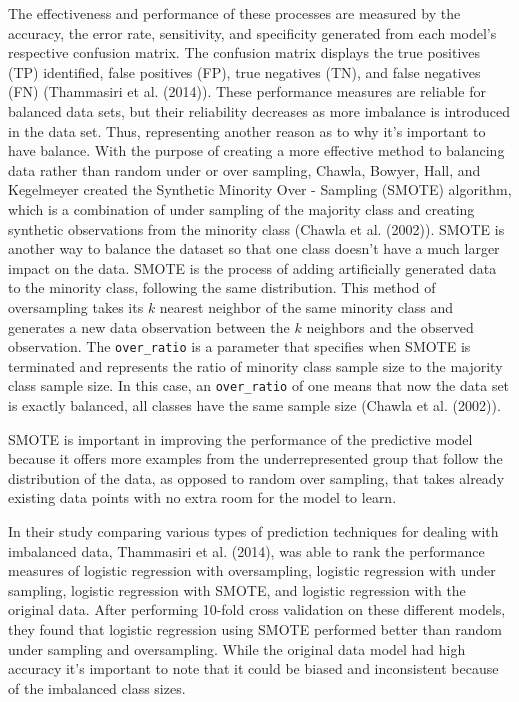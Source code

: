 \documentclass[
  letterpaper,
  DIV=11,
  numbers=noendperiod]{scrartcl}
\begin{document}
The effectiveness and performance of these processes are measured by the
accuracy, the error rate, sensitivity, and specificity generated from
each model's respective confusion matrix. The confusion matrix displays
the true positives (TP) identified, false positives (FP), true negatives
(TN), and false negatives (FN) (Thammasiri et al. (2014)). These
performance measures are reliable for balanced data sets, but their
reliability decreases as more imbalance is introduced in the data set.
Thus, representing another reason as to why it's important to have
balance. With the purpose of creating a more effective method to
balancing data rather than random under or over sampling, Chawla,
Bowyer, Hall, and Kegelmeyer created the Synthetic Minority Over -
Sampling (SMOTE) algorithm, which is a combination of under sampling of
the majority class and creating synthetic observations from the minority
class (Chawla et al. (2002)). SMOTE is another way to balance the
dataset so that one class doesn't have a much larger impact on the data.
SMOTE is the process of adding artificially generated data to the
minority class, following the same distribution. This method of
oversampling takes its \(k\) nearest neighbor of the same minority class
and generates a new data observation between the \(k\) neighbors and the
observed observation. The \texttt{over\_ratio} is a parameter that
specifies when SMOTE is terminated and represents the ratio of minority
class sample size to the majority class sample size. In this case, an
\texttt{over\_ratio} of one means that now the data set is exactly
balanced, all classes have the same sample size (Chawla et al. (2002)).

SMOTE is important in improving the performance of the predictive model
because it offers more examples from the underrepresented group that
follow the distribution of the data, as opposed to random over sampling,
that takes already existing data points with no extra room for the model
to learn.

In their study comparing various types of prediction techniques for
dealing with imbalanced data, Thammasiri et al. (2014), was able to rank
the performance measures of logistic regression with oversampling,
logistic regression with under sampling, logistic regression with SMOTE,
and logistic regression with the original data. After performing 10-fold
cross validation on these different models, they found that logistic
regression using SMOTE performed better than random under sampling and
oversampling. While the original data model had high accuracy it's
important to note that it could be biased and inconsistent because of
the imbalanced class sizes.
\end{document}
